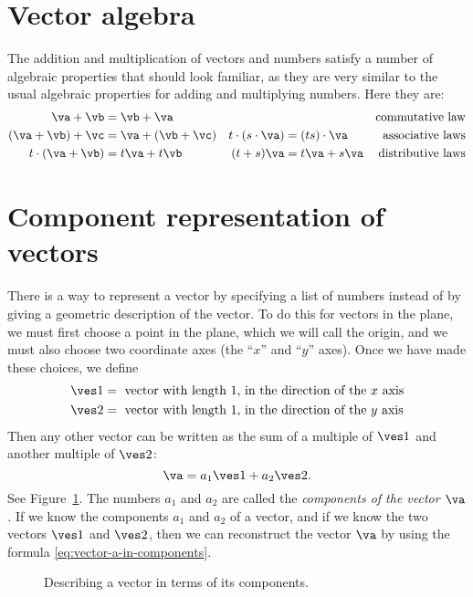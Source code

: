 \section{Vector algebra} %
The addition and multiplication of vectors and numbers satisfy a number of
algebraic properties that should look familiar, as they are very similar to the usual
algebraic properties for adding and multiplying numbers.  Here they are:
\begin{align*}
  \va+\vb&=\vb+\va &&& \text{commutative law}\\
  (\va+\vb)+\vc &= \va+(\vb+\vc) & t\cdot(s\cdot\va) &= (ts)\cdot \va
  &\text{associative laws}\\
  t\cdot(\va+\vb) & = t\va+t\vb & (t+s)\va &= t\va + s\va
  &\text{distributive laws}
\end{align*}
\section{Component representation of vectors} %
There is a way to represent a vector by specifying a list of numbers instead of by
giving a geometric description of the vector.  To do this for vectors in the plane,
we must first choose a point in the plane, which we will call the origin, and we must
also choose two coordinate axes (the ``$x$'' and ``$y$'' axes).  Once we have made
these choices, we define
\begin{align*}
  \ves1 &= \text{ vector with length $1$, in the direction of the $x$ axis} \\
  \ves2 &= \text{ vector with length $1$, in the direction of the $y$ axis}
\end{align*}
Then any other vector can be written as the sum of a multiple of $\ves1$ and another
multiple of $\ves2$:
\begin{equation}
  \va = a_1\ves1 + a_2 \ves2.
  \label{eq:vector-a-in-components}
\end{equation}
See Figure~\ref{fig:vector-in-components}.
The numbers $a_1$ and $a_2$ are called the \emph{components of the vector $\va$.}  If
we know the components $a_1$ and $a_2$ of a vector, and if we know the two vectors
$\ves1$ and $\ves2$, then we can reconstruct the vector $\va$ by using the formula
\eqref{eq:vector-a-in-components}.

\begin{figure}[h]
  
  \caption{Describing a vector in terms of its components.}
  \label{fig:vector-in-components}
\end{figure}

